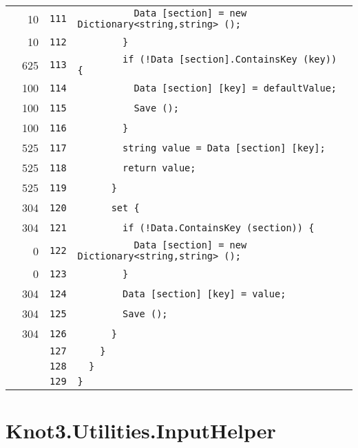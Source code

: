 \documentclass[a4paper,10pt]{article}
\begin{document}
\begin{longtable}[l]{lrrl}
\cellcolor{green} & 10 & \verb~111~ & \verb~          Data [section] = new Dictionary<string,string> ();~\\
\cellcolor{green} & 10 & \verb~112~ & \verb~        }~\\
\cellcolor{green} & 625 & \verb~113~ & \verb~        if (!Data [section].ContainsKey (key)) {~\\
\cellcolor{green} & 100 & \verb~114~ & \verb~          Data [section] [key] = defaultValue;~\\
\cellcolor{green} & 100 & \verb~115~ & \verb~          Save ();~\\
\cellcolor{green} & 100 & \verb~116~ & \verb~        }~\\
\cellcolor{green} & 525 & \verb~117~ & \verb~        string value = Data [section] [key];~\\
\cellcolor{green} & 525 & \verb~118~ & \verb~        return value;~\\
\cellcolor{green} & 525 & \verb~119~ & \verb~      }~\\
\cellcolor{green} & 304 & \verb~120~ & \verb~      set {~\\
\cellcolor{green} & 304 & \verb~121~ & \verb~        if (!Data.ContainsKey (section)) {~\\
\cellcolor{red} & 0 & \verb~122~ & \verb~          Data [section] = new Dictionary<string,string> ();~\\
\cellcolor{red} & 0 & \verb~123~ & \verb~        }~\\
\cellcolor{green} & 304 & \verb~124~ & \verb~        Data [section] [key] = value;~\\
\cellcolor{green} & 304 & \verb~125~ & \verb~        Save ();~\\
\cellcolor{green} & 304 & \verb~126~ & \verb~      }~\\
\cellcolor{gray} &  & \verb~127~ & \verb~    }~\\
\cellcolor{gray} &  & \verb~128~ & \verb~  }~\\
\cellcolor{gray} &  & \verb~129~ & \verb~}~\\
\end{longtable}
\newpage
\section{Knot3.Utilities.InputHelper}
\end{document}
